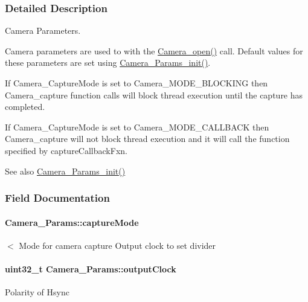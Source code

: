 \subsubsection{Detailed Description}
Camera Parameters. 

Camera parameters are used to with the \hyperlink{_camera_8h_a5bd1f515c97e0f598ff554c663bc6cde}{Camera\+\_\+open()} call. Default values for these parameters are set using \hyperlink{_camera_8h_a522620ae3e5fb202b1f46f5535619564}{Camera\+\_\+\+Params\+\_\+init()}.

If Camera\+\_\+\+Capture\+Mode is set to Camera\+\_\+\+M\+O\+D\+E\+\_\+\+B\+L\+O\+C\+K\+I\+N\+G then Camera\+\_\+capture function calls will block thread execution until the capture has completed.

If Camera\+\_\+\+Capture\+Mode is set to Camera\+\_\+\+M\+O\+D\+E\+\_\+\+C\+A\+L\+L\+B\+A\+C\+K then Camera\+\_\+capture will not block thread execution and it will call the function specified by capture\+Callback\+Fxn.

\begin{DoxySeeAlso}{See also}
\hyperlink{_camera_8h_a522620ae3e5fb202b1f46f5535619564}{Camera\+\_\+\+Params\+\_\+init()} 
\end{DoxySeeAlso}


\subsubsection{Field Documentation}
\paragraph[{capture\+Mode}]{ Camera\+\_\+\+Params\+::capture\+Mode}\label{struct_camera___params_ab370847eb029c1b816830f6a2fb1956f}
$<$ Mode for camera capture Output clock to set divider 
\paragraph[{output\+Clock}]{\setlength{\rightskip}{0pt plus 5cm}uint32\+\_\+t Camera\+\_\+\+Params\+::output\+Clock}\label{struct_camera___params_a0b8e5d861228a67c891ac7737c3546af}
Polarity of Hsync 
